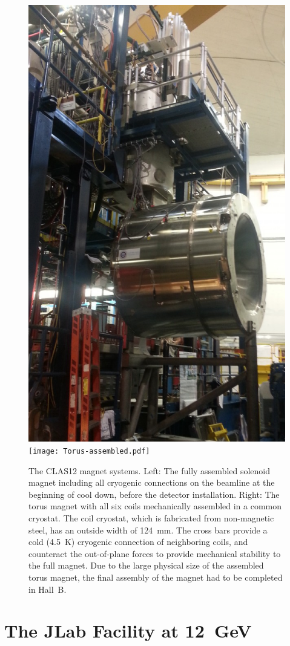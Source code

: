 \documentclass[final,3p,twocolumn]{elsarticle}
\begin{document}
\begin{figure}[th!]
\centerline{\includegraphics[width=0.65\columnwidth]{solenoid-magnet.png}
\texttt{[image: Torus-assembled.pdf]}}
\caption{The CLAS12 magnet systems. Left: The fully assembled solenoid magnet including all cryogenic connections on
  the beamline at the beginning of cool down, before the detector installation. Right: The torus magnet with all six coils
  mechanically assembled in a common cryostat. The coil cryostat, which is fabricated from non-magnetic steel, has an
  outside width of 124~mm. The cross bars provide a cold (4.5~K) cryogenic connection of neighboring coils, and
  counteract the out-of-plane forces to provide mechanical stability to the full magnet. Due to the large physical size of
  the assembled torus magnet, the final assembly of the magnet had to be completed in Hall~B.}
\label{clas12-magnets}
\end{figure}

\section{The JLab Facility at 12~GeV}
\label{jlab}
\end{document}
